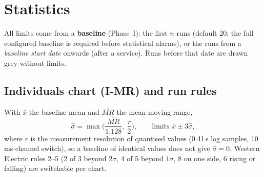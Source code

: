 



\section{Statistics}\label{sec:stats}
All limits come from a \textbf{baseline} (Phase~I): the first $n$ runs (default 20; the full configured baseline is required before statistical alarms), or the runs from a
\emph{baseline start date} onwards (after a service). Runs before that date are drawn grey without limits.



\subsection{Individuals chart (I-MR) and run rules}
With $\bar x$ the baseline mean and $\overline{MR}$ the mean moving range,
\[ \hat\sigma=\max\!\Big(\frac{\overline{MR}}{1.128},\ \frac{r}{2}\Big),\qquad \text{limits } \bar x\pm3\hat\sigma , \]
where $r$ is the measurement resolution of quantised values (0.41\,s log samples, 10\,ms channel switch), so a baseline of
identical values does not give $\hat\sigma=0$. Western Electric rules 2--5 (2 of 3 beyond $2\sigma$, 4 of 5 beyond $1\sigma$,
8 on one side, 6 rising or falling) are switchable per chart.




